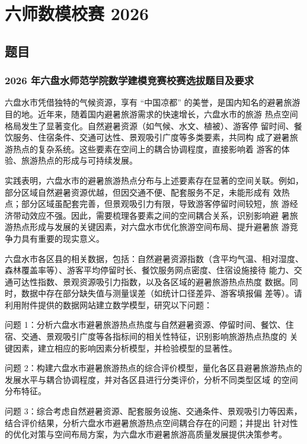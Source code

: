 \section*{六师数模校赛 2026}

\subsection*{题目}
\subsubsection*{2026 年六盘水师范学院数学建模竞赛校赛选拔题目及要求}
六盘水市凭借独特的气候资源，享有 “中国凉都” 的美誉，是国内知名的避暑旅游目的地。近年来，随着国内避暑旅游需求的快速增长，六盘水市的旅游 热点空间格局发生了显著变化。自然避暑资源（如气候、水文、植被）、游客停 留时间、餐饮服务、住宿条件、交通可达性、景观吸引广度等多类要素，共同构 成了避暑旅游热点的复杂系统。这些要素在空间上的耦合协调程度，直接影响着 游客的体验、旅游热点的形成与可持续发展。

实践表明，六盘水市的避暑旅游热点分布与上述要素存在显著的空间关联。例如，部分区域自然避暑资源优越，但因交通不便、配套服务不足，未能形成有 效热点；部分区域虽配套完善，但景观吸引力有限，导致游客停留时间较短，旅 游经济带动效应不强。因此，需要梳理各要素之间的空间耦合关系，识别影响避 暑旅游热点形成与发展的关键因素，对六盘水市优化旅游空间布局、提升避暑旅 游竞争力具有重要的现实意义。

六盘水市各区县的相关数据，包括：自然避暑资源指数（含平均气温、相对湿度、森林覆盖率等）、游客平均停留时长、餐饮服务网点密度、住宿设施接待 能力、交通可达性指数、景观资源吸引力指数，以及各区域的避暑旅游热点热度 数据。同时，数据中存在部分缺失值与测量误差（如统计口径差异、游客填报偏 差等）。请利用附件提供的数据网站建立数学模型，研究以下问题：

问题 1：分析六盘水市避暑旅游热点热度与自然避暑资源、停留时间、餐饮、住宿、交通、景观吸引广度等各指标间的相关性特征，识别影响旅游热点热度的 关键因素，建立相应的影响因素分析模型，并检验模型的显著性。

问题 2：构建六盘水市避暑旅游热点的综合评价模型，量化各区县避暑旅游热点的发展水平与耦合协调程度，并对各区县进行分类评价，分析不同类型区域 的空间分布特征。

问题 3：综合考虑自然避暑资源、配套服务设施、交通条件、景观吸引力等因素，结合评价结果，分析六盘水市避暑旅游热点空间耦合存在的问题；并提出 针对性的优化对策与空间布局方案，为六盘水市避暑旅游高质量发展提供决策参考。

